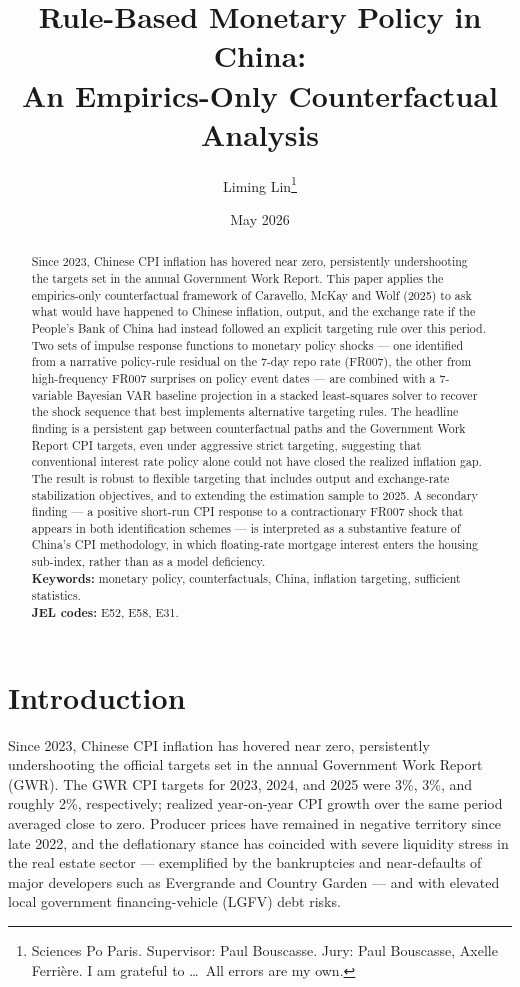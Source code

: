 \documentclass[12pt, a4paper]{article}
\title{\textbf{Rule-Based Monetary Policy in China: \\ An Empirics-Only Counterfactual Analysis}}
\author{Liming Lin\thanks{Sciences Po Paris. Supervisor: Paul Bouscasse. Jury: Paul Bouscasse, Axelle Ferri\`ere. I am grateful to \dots\ All errors are my own.}}
\date{May 2026}
\begin{document}
\maketitle

\begin{abstract}
\noindent Since 2023, Chinese CPI inflation has hovered near zero, persistently undershooting the targets set in the annual Government Work Report. This paper applies the empirics-only counterfactual framework of Caravello, McKay and Wolf (2025) to ask what would have happened to Chinese inflation, output, and the exchange rate if the People's Bank of China had instead followed an explicit targeting rule over this period. Two sets of impulse response functions to monetary policy shocks --- one identified from a narrative policy-rule residual on the 7-day repo rate (FR007), the other from high-frequency FR007 surprises on policy event dates --- are combined with a 7-variable Bayesian VAR baseline projection in a stacked least-squares solver to recover the shock sequence that best implements alternative targeting rules. The headline finding is a persistent gap between counterfactual paths and the Government Work Report CPI targets, even under aggressive strict targeting, suggesting that conventional interest rate policy alone could not have closed the realized inflation gap. The result is robust to flexible targeting that includes output and exchange-rate stabilization objectives, and to extending the estimation sample to 2025. A secondary finding --- a positive short-run CPI response to a contractionary FR007 shock that appears in both identification schemes --- is interpreted as a substantive feature of China's CPI methodology, in which floating-rate mortgage interest enters the housing sub-index, rather than as a model deficiency.
\vspace{0.5em}\\
\noindent \textbf{Keywords:} monetary policy, counterfactuals, China, inflation targeting, sufficient statistics. \\
\textbf{JEL codes:} E52, E58, E31.
\end{abstract}

\section{Introduction}

Since 2023, Chinese CPI inflation has hovered near zero, persistently undershooting the official targets set in the annual Government Work Report (GWR). The GWR CPI targets for 2023, 2024, and 2025 were 3\%, 3\%, and roughly 2\%, respectively; realized year-on-year CPI growth over the same period averaged close to zero. Producer prices have remained in negative territory since late 2022, and the deflationary stance has coincided with severe liquidity stress in the real estate sector --- exemplified by the bankruptcies and near-defaults of major developers such as Evergrande and Country Garden --- and with elevated local government financing-vehicle (LGFV) debt risks.
\end{document}
